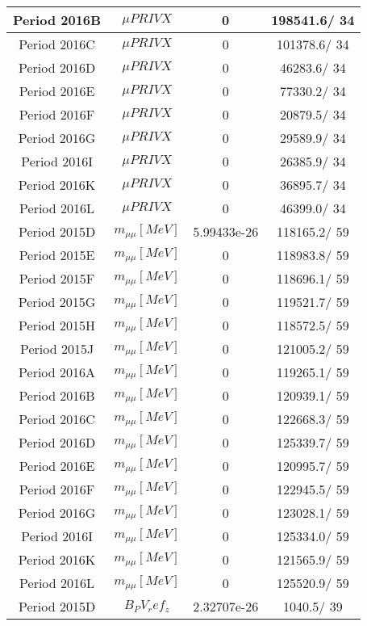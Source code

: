 \documentclass{article}
\begin{document}
\begin{longtable}{c|c|c|c}
\hline
 Period 2016B & $\mu PRIVX$ & 0 & 198541.6/ 34\\
\hline
 Period 2016C & $\mu PRIVX$ & 0 & 101378.6/ 34\\
\hline
 Period 2016D & $\mu PRIVX$ & 0 & 46283.6/ 34\\
\hline
 Period 2016E & $\mu PRIVX$ & 0 & 77330.2/ 34\\
\hline
 Period 2016F & $\mu PRIVX$ & 0 & 20879.5/ 34\\
\hline
 Period 2016G & $\mu PRIVX$ & 0 & 29589.9/ 34\\
\hline
 Period 2016I & $\mu PRIVX$ & 0 & 26385.9/ 34\\
\hline
 Period 2016K & $\mu PRIVX$ & 0 & 36895.7/ 34\\
\hline
 Period 2016L & $\mu PRIVX$ & 0 & 46399.0/ 34\\
\hline
 Period 2015D & $m_{\mu\mu} [MeV]$ & 5.99433e-26 & 118165.2/ 59\\
\hline
 Period 2015E & $m_{\mu\mu} [MeV]$ & 0 & 118983.8/ 59\\
\hline
 Period 2015F & $m_{\mu\mu} [MeV]$ & 0 & 118696.1/ 59\\
\hline
 Period 2015G & $m_{\mu\mu} [MeV]$ & 0 & 119521.7/ 59\\
\hline
 Period 2015H & $m_{\mu\mu} [MeV]$ & 0 & 118572.5/ 59\\
\hline
 Period 2015J & $m_{\mu\mu} [MeV]$ & 0 & 121005.2/ 59\\
\hline
 Period 2016A & $m_{\mu\mu} [MeV]$ & 0 & 119265.1/ 59\\
\hline
 Period 2016B & $m_{\mu\mu} [MeV]$ & 0 & 120939.1/ 59\\
\hline
 Period 2016C & $m_{\mu\mu} [MeV]$ & 0 & 122668.3/ 59\\
\hline
 Period 2016D & $m_{\mu\mu} [MeV]$ & 0 & 125339.7/ 59\\
\hline
 Period 2016E & $m_{\mu\mu} [MeV]$ & 0 & 120995.7/ 59\\
\hline
 Period 2016F & $m_{\mu\mu} [MeV]$ & 0 & 122945.5/ 59\\
\hline
 Period 2016G & $m_{\mu\mu} [MeV]$ & 0 & 123028.1/ 59\\
\hline
 Period 2016I & $m_{\mu\mu} [MeV]$ & 0 & 125334.0/ 59\\
\hline
 Period 2016K & $m_{\mu\mu} [MeV]$ & 0 & 121565.9/ 59\\
\hline
 Period 2016L & $m_{\mu\mu} [MeV]$ & 0 & 125520.9/ 59\\
\hline
 Period 2015D & $B_PV_ref_z$ & 2.32707e-26 & 1040.5/ 39\\

\end{longtable}
\end{document}
